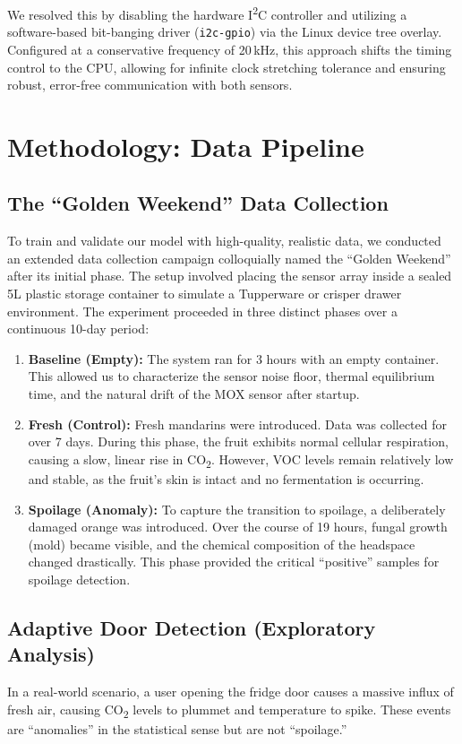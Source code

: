 \documentclass[conference]{IEEEtran}
\begin{document}
    We resolved this by disabling the hardware I\textsuperscript{2}C controller and utilizing a software-based bit-banging driver (\texttt{i2c-gpio}) via the Linux device tree overlay. Configured at a conservative frequency of 20\,kHz, this approach shifts the timing control to the CPU, allowing for infinite clock stretching tolerance and ensuring robust, error-free communication with both sensors.

    \section{Methodology: Data Pipeline}

    \subsection{The ``Golden Weekend'' Data Collection}
    To train and validate our model with high-quality, realistic data, we conducted an extended data collection campaign colloquially named the ``Golden Weekend'' after its initial phase. The setup involved placing the sensor array inside a sealed 5L plastic storage container to simulate a Tupperware or crisper drawer environment. The experiment proceeded in three distinct phases over a continuous 10-day period:

    \begin{enumerate}
        \item \textbf{Baseline (Empty):} The system ran for 3 hours with an empty container. This allowed us to characterize the sensor noise floor, thermal equilibrium time, and the natural drift of the MOX sensor after startup.
        \item \textbf{Fresh (Control):} Fresh mandarins were introduced. Data was collected for over 7 days. During this phase, the fruit exhibits normal cellular respiration, causing a slow, linear rise in CO\textsubscript{2}. However, VOC levels remain relatively low and stable, as the fruit's skin is intact and no fermentation is occurring.
        \item \textbf{Spoilage (Anomaly):} To capture the transition to spoilage, a deliberately damaged orange was introduced. Over the course of 19 hours, fungal growth (mold) became visible, and the chemical composition of the headspace changed drastically. This phase provided the critical ``positive'' samples for spoilage detection.
    \end{enumerate}

    \subsection{Adaptive Door Detection (Exploratory Analysis)}
    In a real-world scenario, a user opening the fridge door causes a massive influx of fresh air, causing CO\textsubscript{2} levels to plummet and temperature to spike. These events are ``anomalies'' in the statistical sense but are not ``spoilage.''
\end{document}
